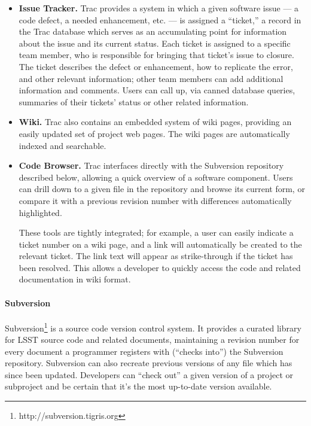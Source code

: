 \begin{itemize} \item{\textbf{Issue Tracker.} Trac provides a system in which a
given software issue --- a code defect, a needed enhancement, etc. --- is
assigned a ``ticket,'' a record in the Trac database which serves as an
accumulating point for information about the issue and its current status. Each
ticket is assigned to a specific team member, who is responsible for bringing
that ticket's issue to closure. The ticket describes the defect or enhancement,
how to replicate the error, and other relevant information; other team members
can add additional information and comments. Users can call up, via canned
database queries, summaries of their tickets' status or other related
information.}

\item{\textbf{Wiki.} Trac also contains an embedded system of wiki pages,
providing an easily updated set of project web pages. 
The wiki pages are automatically indexed and 
searchable.}

\item{\textbf{Code Browser.} Trac interfaces directly with the Subversion
repository described below, allowing a quick overview of a software component.
Users can drill down to a given file in the repository and browse its current
form, or compare it with a previous revision number with differences
automatically highlighted.}

These tools are tightly integrated; for example, a user can easily indicate
a ticket number on a wiki page, and a link will automatically be created 
to the relevant ticket. The link text will appear as strike-through if the
ticket has been resolved. This allows a developer to quickly access 
the code and related documentation in wiki format. 

\end{itemize}

\paragraph{Subversion} Subversion\footnote{http://subversion.tigris.org}
is a source code version control system.
It provides a curated library for LSST source code and related documents,
maintaining a revision number for every document a programmer registers with
(``checks into'') the Subversion repository. Subversion can also recreate
previous versions of any file which has since been updated. Developers can
``check out'' a given version of a project or subproject and be certain that
it's the most up-to-date version available.

